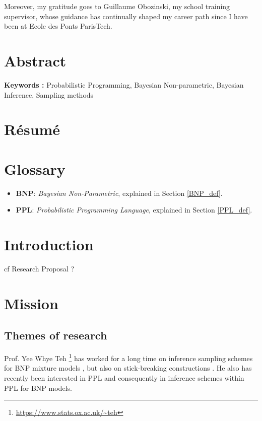 \documentclass[twoside,10pt,openany,a4paper]{rapport}
\begin{document}
Moreover, my gratitude goes to Guillaume Obozinski, my school training supervisor, whose guidance has continually shaped my career path since I have been at Ecole des Ponts ParisTech.

\chapter{Abstract}

\textbf{Keywords :} Probabilistic Programming, Bayesian Non-parametric, Bayesian Inference, Sampling methods


\chapter{Résumé}



\tableofcontents
{}
\listoffigures
{}

\chapter{Glossary}

\begin{itemize} 
\item \textbf{BNP}:  \textit{Bayesian Non-Parametric}, explained in Section \ref{BNP_def}. \\
\item \textbf{PPL}:  \textit{Probabilistic Programming Language}, explained in Section \ref{PPL_def}. \\

\end{itemize}

\mainmatter


\chapter{Introduction}
cf Research Proposal ?





\chapter{Mission}
\section{Themes of research}
Prof. Yee Whye Teh \footnote{\url{https://www.stats.ox.ac.uk/~teh}} has worked for a long time on inference sampling schemes for \gls{BNP} mixture models \cite{Favaro:2013fl, Favaro:2014kg, Lomeli:2015vd, Lomeli:2017kp}, but also on stick-breaking constructions \cite{stick-breaking-ibp, Favaro:2014bo}.
He also has recently been interested in \gls{PPL} and consequently in inference schemes within \gls{PPL} for \gls{BNP} models.
\end{document}
